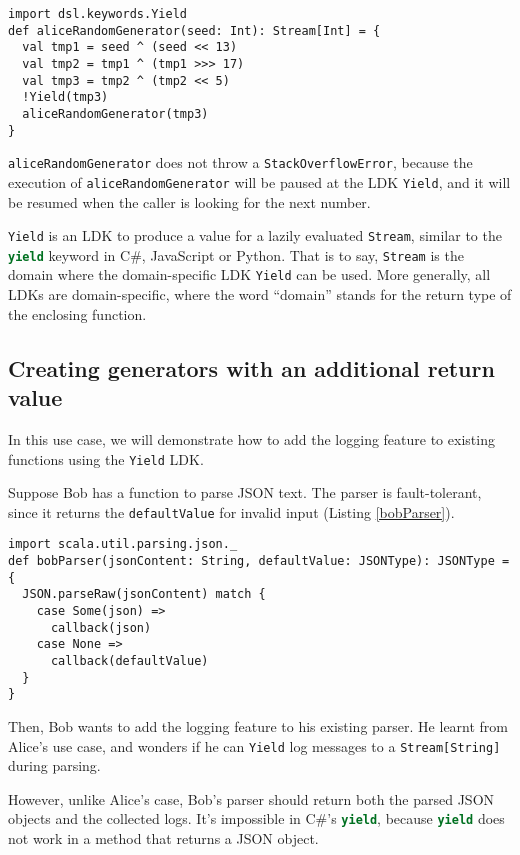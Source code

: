 \begin{lstlisting}[caption={The implementation of Alice's pseudo-random number generator},label={aliceRandomGenerator}]
import dsl.keywords.Yield
def aliceRandomGenerator(seed: Int): Stream[Int] = {
  val tmp1 = seed ^ (seed << 13)
  val tmp2 = tmp1 ^ (tmp1 >>> 17)
  val tmp3 = tmp2 ^ (tmp2 << 5)
  !Yield(tmp3)
  aliceRandomGenerator(tmp3)
}
\end{lstlisting}

\lstinline{aliceRandomGenerator} does not throw a \lstinline{StackOverflowError}, because the execution of \lstinline{aliceRandomGenerator} will be paused at the LDK \lstinline{Yield}, and it will be resumed when the caller is looking for the next number.

\lstinline{Yield} is an LDK to produce a value for a lazily evaluated \lstinline{Stream}, similar to the \lstinline[language=Python]{yield} keyword in C\#, JavaScript or Python. That is to say, \lstinline{Stream} is the domain where the domain-specific LDK \lstinline{Yield} can be used. More generally, all LDKs are domain-specific, where the word ``domain'' stands for the return type of the enclosing function.

\subsection{Creating generators with an additional return value}

In this use case, we will demonstrate how to add the logging feature to existing functions using the \lstinline{Yield} LDK.

Suppose Bob has a function to parse JSON text. The parser is fault-tolerant, since it returns the \lstinline{defaultValue} for invalid input  (Listing \ref{bobParser}).

\begin{lstlisting}[caption={The original implementation of Bob's parser},label={bobParser}]
import scala.util.parsing.json._
def bobParser(jsonContent: String, defaultValue: JSONType): JSONType = {
  JSON.parseRaw(jsonContent) match {
    case Some(json) =>
      callback(json)
    case None =>
      callback(defaultValue)
  }
}
\end{lstlisting}

Then, Bob wants to add the logging feature to his existing parser. He learnt from Alice's use case, and wonders if he can \lstinline{Yield} log messages to a \lstinline{Stream[String]} during parsing.

However, unlike Alice's case, Bob's parser should return both the parsed JSON objects and the collected logs. It's impossible in C\#'s \lstinline[language=Python]{yield}, because \lstinline[language=Python]{yield} does not work in a method that returns a JSON object.

